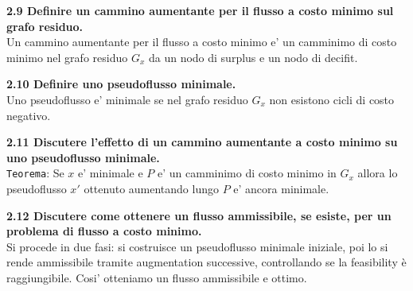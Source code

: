 \documentclass[a4paper,11pt]{article}
\newcommand{\domanda}[2]{%
  \vspace{0.6em}
  \noindent\textbf{#1}\\[0.2em]
  \noindent#2
  \vspace{1em}
  \par
}
\begin{document}
\domanda{2.9 \quad Definire un cammino aumentante per il flusso a costo minimo sul grafo residuo.}{
Un cammino aumentante per il flusso a costo minimo e' un camminimo di costo minimo nel grafo residuo $G_x$ da un nodo di surplus e un nodo di decifit.
}

\domanda{2.10 \quad Definire uno pseudoflusso minimale.}{
Uno pseudoflusso e' minimale se nel grafo residuo $G_x$ non esistono cicli di costo negativo.
}

\domanda{2.11 \quad Discutere l'effetto di un cammino aumentante a costo minimo su uno pseudoflusso minimale.}{
\texttt{Teorema}: Se $x$ e' minimale e $P$ e' un camminimo di costo minimo in $G_x$ allora lo pseudoflusso $x'$ ottenuto aumentando lungo $P$ e' ancora minimale.
}

\domanda{2.12 \quad Discutere come ottenere un flusso ammissibile, se esiste, per un problema di flusso a costo minimo.}{
Si procede in due fasi: si costruisce un pseudoflusso minimale iniziale, poi lo si rende ammissibile tramite augmentation successive, controllando se la feasibility è raggiungibile. Cosi' otteniamo un flusso ammissibile e ottimo.
}
\end{document}
